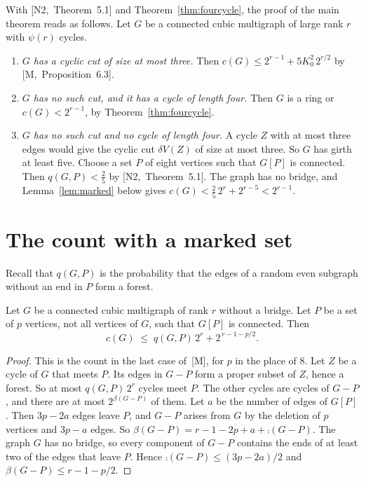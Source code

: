 \documentclass[11pt]{article}
\newcommand{\M}[1]{[M,~#1]}
\newcommand{\NN}[1]{[N2,~#1]}
\begin{document}
With \NN{Theorem~5.1} and Theorem~\ref{thm:fourcycle}, the proof of the main theorem reads as
follows. Let $G$ be a connected cubic multigraph of large rank $r$ with $\psi(r)$ cycles.

\begin{enumerate}[leftmargin=1.6em]
\item \emph{$G$ has a cyclic cut of size at most three.} Then
$c(G)\le2^{r-1}+5K_0^{2}\,2^{r/2}$ by \M{Proposition~6.3}.
\item \emph{$G$ has no such cut, and it has a cycle of length four.} Then $G$ is a ring or
$c(G)<2^{r-1}$, by Theorem~\ref{thm:fourcycle}.
\item \emph{$G$ has no such cut and no cycle of length four.} A cycle $Z$ with at most three
edges would give the cyclic cut $\delta V(Z)$ of size at most three. So $G$ has girth at least
five. Choose a set $P$ of eight vertices such that $G[P]$ is connected. Then $q(G,P)<\frac25$ by
\NN{Theorem~5.1}. The graph has no bridge, and Lemma~\ref{lem:marked} below gives
$c(G)<\frac25\,2^{r}+2^{r-5}<2^{r-1}$.
\end{enumerate}

\section{The count with a marked set}\label{sec:marked}

Recall that $q(G,P)$ is the probability that the edges of a random even subgraph without an end
in $P$ form a forest.

\begin{lemma}\label{lem:marked}
Let $G$ be a connected cubic multigraph of rank $r$ without a bridge. Let $P$ be a set of $p$
vertices, not all vertices of $G$, such that $G[P]$ is connected. Then
\[
  c(G)\;\le\;q(G,P)\,2^{r}+2^{\,r-1-p/2}.
\]
\end{lemma}

\begin{proof}
This is the count in the last case of~[M], for $p$ in the place of $8$. Let $Z$ be a cycle of $G$
that meets $P$. Its edges in $G-P$ form a proper subset of $Z$, hence a forest. So at most
$q(G,P)\,2^{r}$ cycles meet $P$. The other cycles are cycles of $G-P$, and there are at most
$2^{\beta(G-P)}$ of them. Let $a$ be the number of edges of $G[P]$. Then $3p-2a$ edges leave $P$,
and $G-P$ arises from $G$ by the deletion of $p$ vertices and $3p-a$ edges. So
$\beta(G-P)=r-1-2p+a+\comp(G-P)$. The graph $G$ has no bridge, so every component of $G-P$
contains the ends of at least two of the edges that leave $P$. Hence $\comp(G-P)\le(3p-2a)/2$ and
$\beta(G-P)\le r-1-p/2$.
\end{proof}
\end{document}
